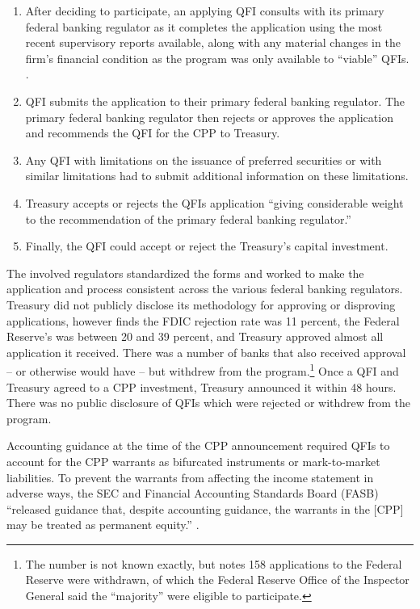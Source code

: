 \documentclass[12pt]{article}
\begin{document}
\begin{enumerate}
\item After deciding to participate, an applying QFI consults with its primary federal banking regulator as it completes the application using the most recent supervisory reports available, along with any material changes in the firm's financial condition as the program was only available to ``viable'' QFIs. \citep{CPPFaq}. 
\item QFI submits the application to their primary federal banking regulator. The primary federal banking regulator then rejects or approves the application and recommends the QFI for the CPP to Treasury. 
\item Any QFI with limitations on the issuance of preferred securities or with similar limitations had to submit additional information on these limitations. 
\item Treasury accepts or rejects the QFIs application ``giving considerable weight to the recommendation of the primary federal banking regulator.'' 
\item Finally, the QFI could accept or reject the Treasury's capital investment.
\end{enumerate}

The involved regulators standardized the forms and worked to make the application and process consistent across the various federal banking regulators.  Treasury did not publicly disclose its methodology for approving or disproving applications, however \citet{RejectionRates} finds the FDIC rejection rate was 11 percent, the Federal Reserve's was between 20 and 39 percent, and Treasury approved almost all application it received. There was a number of banks that also received approval -- or otherwise would have -- but withdrew from the program.\footnote{The number is not known exactly, but \citet{RejectionRates} notes 158 applications to the Federal Reserve were withdrawn, of which the Federal Reserve Office of the Inspector General said the ``majority'' were eligible to participate.} Once a QFI and Treasury agreed to a CPP investment, Treasury announced it within 48 hours. There was no public disclosure of QFIs which were rejected or withdrew from the program. 

Accounting guidance at the time of the CPP announcement required QFIs to account for the CPP warrants as bifurcated instruments or mark-to-market liabilities. To prevent the warrants from affecting the income statement in adverse ways, the SEC and Financial Accounting Standards Board (FASB) ``released guidance that, despite accounting guidance, the warrants in the [CPP] may be treated as permanent equity.'' \citep{mofo}. 
\end{document}
